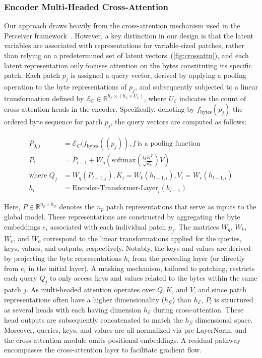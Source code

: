 \subsubsection{Encoder Multi-Headed Cross-Attention}
\label{sec:enc-cross-attn}
Our approach draws heavily from the cross-attention mechanism used in the Perceiver framework~\citep{jaegle2021perceiver}. However, a key distinction in our design is that the latent variables are associated with representations for variable-sized patches, rather than relying on a predetermined set of latent vectors~(\autoref{fig:crossattn}), and each latent representation only focuses attention on the bytes constituting its specific patch. Each patch $p_j$ is assigned a query vector, derived by applying a pooling operation to the byte representations of $p_j$, and subsequently subjected to a linear transformation defined by $\mathcal{E}_{C} \in \mathbb{R}^{h_{\mathcal{E}} \times (h_{\mathcal{E}} \times U_{\mathcal{E}})}$, where $U_{\mathcal{E}}$ indicates the count of cross-attention heads in the encoder. Specifically, denoting by $f_{\text{bytes}}(p_j)$ the ordered byte sequence for patch $p_j$, the query vectors are computed as follows:

\begin{align}
P_{0,j} &= \mathcal{E}_{C}(f_\text{bytes}((p_j)), f~ \text{is a pooling function} \\
P_l &= P_{l-1} + W_o\left(\text{softmax}\left(\frac{QK^T}{\sqrt{d_k}}\right)V\right) \\
\text{where } Q_j &= W_q(P_{l-1,j}), K_i = W_k(h_{l-1,i}), V_i = W_v(h_{l-1,i}) \\
h_l &= \text{Encoder-Transformer-Layer}_l(h_{l-1})
\end{align}

Here, $P \in \mathbb{R}^{n_p \times h_{\mathcal{G}}}$ denotes the $n_p$ patch representations that serve as inputs to the global model. These representations are constructed by aggregating the byte embeddings $e_i$ associated with each individual patch $p_j$. The matrices $W_q$, $W_k$, $W_v$, and $W_o$ correspond to the linear transformations applied for the queries, keys, values, and outputs, respectively. Notably, the keys and values are derived by projecting the byte representations $h_i$ from the preceding layer (or directly from $e_i$ in the initial layer). A masking mechanism, tailored to patching, restricts each query $Q_j$ to only access keys and values related to the bytes within the same patch $j$. As multi-headed attention operates over $Q, K$, and $V$, and since patch representations often have a higher dimensionality ($h_{\mathcal{G}}$) than $h_{\mathcal{E}}$, $P_l$ is structured as several heads with each having dimension $h_{\mathcal{E}}$ during cross-attention. These head outputs are subsequently concatenated to match the $h_{\mathcal{G}}$ dimensional space. Moreover, queries, keys, and values are all normalized via pre-LayerNorm, and the cross-attention module omits positional embeddings. A residual pathway encompasses the cross-attention layer to facilitate gradient flow.

